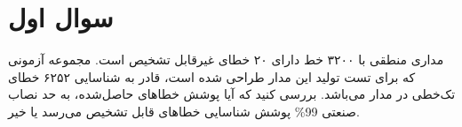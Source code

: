 \section{سوال اول}

مداری منطقی با ۳۲۰۰ خط دارای ۲۰ خطای  غیرقابل تشخیص است. مجموعه آزمونی که برای تست تولید این مدار طراحی شده است، قادر به شناسایی ۶۲۵۲ خطای  تک‌خطی در مدار می‌باشد. بررسی کنید که آیا پوشش خطاهای حاصل‌شده، به حد نصاب صنعتی 99\% پوشش شناسایی خطاهای قابل تشخیص می‌رسد یا خیر.




\begin{qsolve}
	
\end{qsolve}



